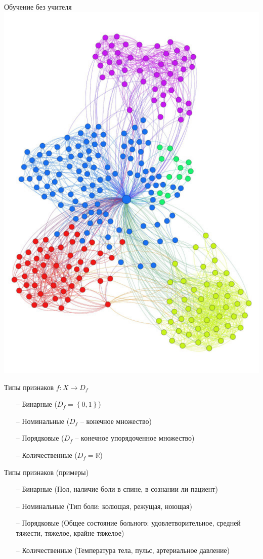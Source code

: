 \documentclass[10pt]{beamer}
\begin{document}
\begin{frame}{Обучение без учителя}
  \centering
  \includegraphics[width=0.9 \linewidth, height=0.9 \textheight, keepaspectratio]{images/clustering}\\
\end{frame}

\begin{frame}{Типы признаков}
	${f: X \rightarrow D_f}$
	\begin{itemize}
	  \item[--] Бинарные (${D_f = \left\{ 0, 1 \right\} }$)
	  \item[--] Номинальные (${D_f}$ -- конечное множество)
	  \item[--] Порядковые (${D_f}$ -- конечное упорядоченное множество)
	  \item[--] Количественные (${D_f = \mathbb{R} }$)
	\end{itemize}
\end{frame}

\begin{frame}{Типы признаков (примеры)}
	\begin{itemize}
	  \item[--] Бинарные (Пол, наличие боли в спине, в сознании ли пациент)
	  \item[--] Номинальные (Тип боли: колющая, режущая, ноющая)
	  \item[--] Порядковые (Общее состояние больного: удовлетворительное, средней тяжести, тяжелое, крайне тяжелое)
	  \item[--] Количественные (Температура тела, пульс, артериальное давление)
	\end{itemize}
\end{frame}
\end{document}
